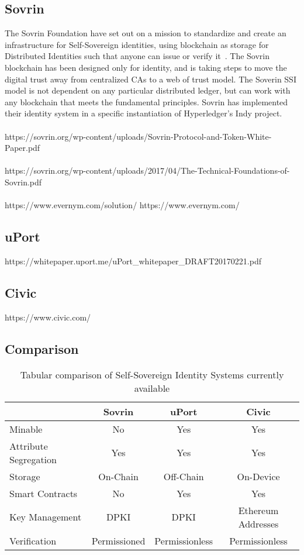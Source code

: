 \subsection{Sovrin}
The Sovrin Foundation have set out on a mission to standardize and create an infrastructure for Self-Sovereign identities, using blockchain as storage for Distributed Identities such that anyone can issue or verify it~\cite{sovrin}. The Sovrin blockchain has been designed only for identity, and is taking steps to move the digital trust away from centralized CAs to a web of trust model. The Soverin SSI model is not dependent on any particular distributed ledger, but can work with any blockchain that meets the fundamental principles. Sovrin has implemented their identity system in a specific instantiation of Hyperledger's Indy project.
\\\\
https://sovrin.org/wp-content/uploads/Sovrin-Protocol-and-Token-White-Paper.pdf
\\\\ https://sovrin.org/wp-content/uploads/2017/04/The-Technical-Foundations-of-Sovrin.pdf
\\\\
https://www.evernym.com/solution/
https://www.evernym.com/

\subsection{uPort}
https://whitepaper.uport.me/uPort\_whitepaper\_DRAFT20170221.pdf


\subsection{Civic}
https://www.civic.com/

\subsection{Comparison}
\begin{table}[ht]
\begin{center}
\begin{tabular}{|l|c|c|c|}
\hline
 & Sovrin & uPort & Civic \\
\hline
Minable & No & Yes & Yes  \\
Attribute Segregation & Yes & Yes & Yes \\
Storage & On-Chain & Off-Chain & On-Device \\
Smart Contracts & No & Yes & Yes \\
Key Management & DPKI & DPKI & Ethereum Addresses \\
Verification & Permissioned & Permissionless & Permissionless  \\
\hline
\end{tabular}
\caption[Comparison of SSI Systems]{Tabular comparison of Self-Sovereign Identity Systems currently available}
\label{tbl:SSIS}
\end{center}
\end{table}